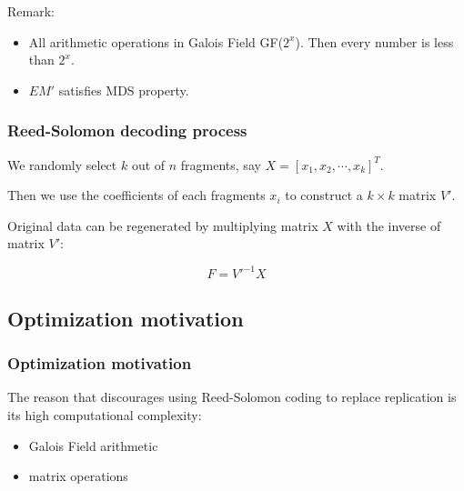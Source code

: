 \documentclass[slidestop,compress,mathserif]{beamer}
\begin{document}
\begin{frame}[options]
{}

{
Remark:
\begin{itemize}
  \item All arithmetic operations in Galois Field GF($2^{x}$). Then every number is less than $2^{x}$.
  \item $EM'$ satisfies MDS property.
\end{itemize}

}
\end{frame}


\begin{frame}[options]
\frametitle{Reed-Solomon decoding process}
We randomly select $k$ out of $n$ fragments, say $X = [x_{1}, x_{2}, \cdots, x_{k}]^{T}$.

Then we use the coefficients of each fragments $x_{i}$ to construct a $k \times k$ matrix $V'$.

Original data can be regenerated by multiplying matrix $X$ with the inverse of matrix $V'$:

$$
F = V'^{-1} X 
$$
\end{frame}


\subsection{Optimization motivation}
\begin{frame}[options]
\frametitle{Optimization motivation}
The reason that discourages using Reed-Solomon coding to replace replication is its high computational complexity:
\begin{itemize}
  \item Galois Field arithmetic
  \item matrix operations
\end{itemize}
\end{frame}
\end{document}
